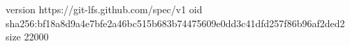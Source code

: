 version https://git-lfs.github.com/spec/v1
oid sha256:bf18a8d9a4e7bfe2a46bc515b683b74475609e0dd3c41dfd257f86b96af2ded2
size 22000

